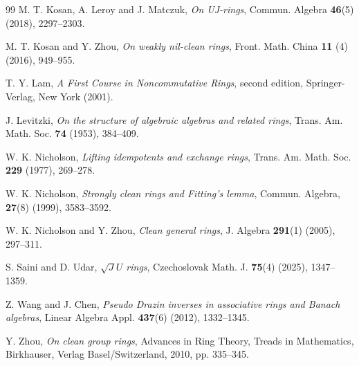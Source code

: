 \documentclass[12pt]{amsart}
\begin{document}
\begin{thebibliography}{99}
M. T. Kosan, A. Leroy and J. Matczuk, {\it On UJ-rings}, Commun. Algebra {\bf 46}(5) (2018), 2297--2303.

M. T. Kosan and Y. Zhou, {\it On weakly nil-clean rings}, Front. Math. China {\bf 11} (4) (2016), 949--955.

T. Y. Lam, {\it A First Course in Noncommutative Rings}, second edition, Springer-Verlag, New York (2001).

J. Levitzki, {\it On the structure of algebraic algebras and related rings}, Trans. Am. Math. Soc. {\bf 74} (1953), 384--409.

W. K. Nicholson, {\it Lifting idempotents and exchange rings}, Trans. Am. Math. Soc. {\bf 229} (1977),   269--278.

W. K. Nicholson, {\it Strongly clean rings and Fitting's lemma}, Commun. Algebra, {\bf 27}(8) (1999),    3583--3592.

W. K. Nicholson and Y. Zhou, {\it Clean general rings}, J. Algebra {\bf 291}(1) (2005), 297--311.

S. Saini and D. Udar, {\it $\sqrt{J}U$ rings}, Czechoslovak Math. J. {\bf 75}(4) (2025), 1347--1359.

Z. Wang and J. Chen, {\it Pseudo Drazin inverses in associative rings and Banach algebras}, Linear Algebra Appl. {\bf 437}(6) (2012), 1332--1345.

Y. Zhou, {\it On clean group rings}, Advances in Ring Theory, Treads in Mathematics, Birkhauser, Verlag Basel/Switzerland, 2010, pp. 335--345.

\end{thebibliography}
\end{document}
